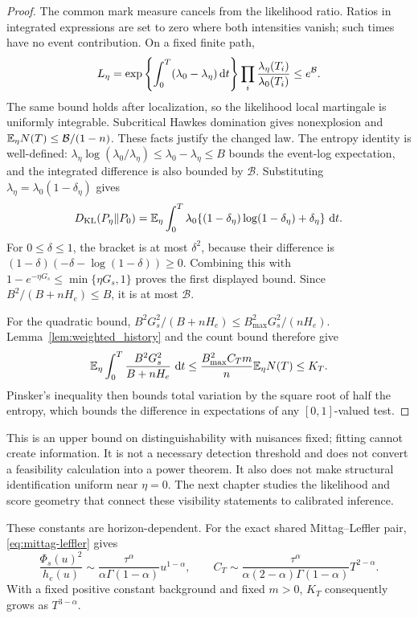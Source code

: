 \begin{proof}
The common mark measure cancels from the likelihood ratio. Ratios in integrated expressions are set to zero where both intensities vanish; such times have no event contribution. On a fixed finite path,
\[
L_\eta=\exp\left\{\int_0^T(\lambda_0-\lambda_\eta)\mathop{}\!\mathrm{d} t\right\}
\prod_i\frac{\lambda_\eta(T_i)}{\lambda_0(T_i)}
\le e^{\mathcal B}.
\]
The same bound holds after localization, so the likelihood local martingale is uniformly integrable. Subcritical Hawkes domination gives nonexplosion and \(\mathbb{E} _\eta N(T)\le\mathcal B/(1-n)\). These facts justify the changed law. The entropy identity is well-defined: \(\lambda_\eta\log(\lambda_0/\lambda_\eta)\le\lambda_0-\lambda_\eta\le B\) bounds the event-log expectation, and the integrated difference is also bounded by \(\mathcal B\). Substituting \(\lambda_\eta=\lambda_0(1-\delta_\eta)\) gives
\[
D_{\mathrm{KL}}(P_\eta\Vert P_0)=\mathbb{E} _\eta\int_0^T\lambda_0
\{(1-\delta_\eta)\log(1-\delta_\eta)+\delta_\eta\}\,\mathop{}\!\mathrm{d} t.
\]
For \(0\le\delta\le1\), the bracket is at most \(\delta^2\), because their difference is \((1-\delta)(-\delta-\log(1-\delta))\ge0\). Combining this with \(1-e^{-\eta G_s}\le\min\{\eta G_s,1\}\) proves the first displayed bound. Since \(B^2/(B+nH_e)\le B\), it is at most \(\mathcal B\).

For the quadratic bound, \(B^2G_s^2/(B+nH_e)\leq B_{\max}^2G_s^2/(nH_e)\). Lemma~\ref{lem:weighted_history} and the count bound therefore give
\[
\mathbb{E}_\eta\int_0^T\frac{B^2G_s^2}{B+nH_e}\,\mathop{}\!\mathrm{d} t
\leq\frac{B_{\max}^2C_Tm}{n}\mathbb{E}_\eta N(T)\leq K_T.
\]
Pinsker's inequality then bounds total variation by the square root of half the entropy, which bounds the difference in expectations of any \([0,1]\)-valued test.
\end{proof}

This is an upper bound on distinguishability with nuisances fixed; fitting cannot create information. It is not a necessary detection threshold and does not convert a feasibility calculation into a power theorem. It also does not make structural identification uniform near \(\eta=0\). The next chapter studies the likelihood and score geometry that connect these visibility statements to calibrated inference.

These constants are horizon-dependent. For the exact shared Mittag--Leffler pair, \eqref{eq:mittag-leffler} gives
\[
\frac{\Phi_s(u)^2}{h_e(u)}\sim
\frac{\tau^\alpha}{\alpha\Gamma(1-\alpha)}u^{1-\alpha},
\qquad
C_T\sim\frac{\tau^\alpha}{\alpha(2-\alpha)\Gamma(1-\alpha)}T^{2-\alpha}.
\]
With a fixed positive constant background and fixed $m>0$, $K_T$
consequently grows as $T^{3-\alpha}$.

